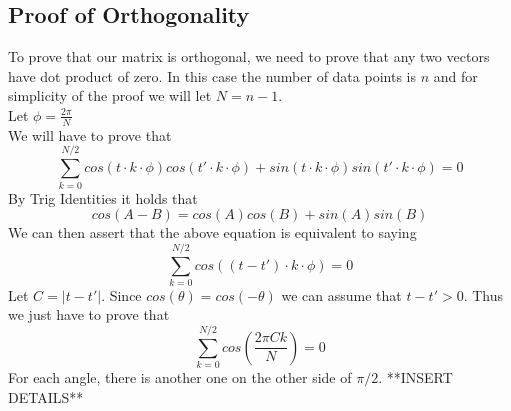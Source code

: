 \documentclass[11pt,psfig]{article}
\begin{document}
\setlength{\parskip}{1.2ex plus0.3ex minus 0.3ex}

\subsection*{Proof of Orthogonality}

To prove that our matrix is orthogonal, we need to prove that any two vectors have dot product of zero. In this case the number of data points is $n$ and for simplicity of the proof we will let $N = n-1$. 
\\
Let $\phi = \frac{2\pi}{N}$
\\
We will have to prove that
\[
\sum_{k=0}^{N/2}{cos(t \cdot k \cdot \phi)cos(t' \cdot k \cdot \phi) + sin(t \cdot k \cdot \phi)sin(t' \cdot k \cdot \phi)} = 0
\]
By Trig Identities it holds that
\[
cos(A-B) = cos(A)cos(B) + sin(A)sin(B)
\]
We can then assert that the above equation is equivalent to saying
\[
\sum_{k=0}^{N/2}{cos((t-t') \cdot k \cdot \phi)} = 0
\]
Let $C = |t-t'|$. Since $cos(\theta)=cos(-\theta)$ we can assume that $t-t'>0$. Thus we just have to prove that
\[
\sum_{k=0}^{N/2}{cos(\frac{2\pi C k}{N})} = 0
\]
For each angle, there is another one on the other side of $\pi/2$. **INSERT DETAILS**
\end{document}
